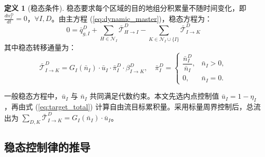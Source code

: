 \documentclass[a4paper,12pt]{article}
\theoremstyle{plain}
\theoremstyle{definition}
\newtheorem{definition}[theorem]{定义}
\theoremstyle{remark}
\begin{document}
\begin{definition}[稳态条件]\label{def:steady_state}
稳态要求每个区域的目的地组分积累量不随时间变化，即 $\frac{dn_I^D}{dt} = 0$，$\forall I, D$。由主方程 (\ref{eq:dynamic_master})，稳态方程为：
\begin{equation}\label{eq:steady_state_eq}
    0 = \bar{q}_{g,I}^D + \sum_{H \in \mathcal{N}_I} \bar{\mathcal{T}}_{H \to I}^D - \sum_{K \in \mathcal{N}_I \cup \{I\}} \bar{\mathcal{T}}_{I \to K}^D
\end{equation}
其中稳态转移通量为：
\begin{equation}\label{eq:steady_transfer}
    \bar{\mathcal{T}}_{I \to K}^D = G_I(\bar{n}_I) \cdot \bar{u}_I \cdot \bar\pi_I^D \cdot \beta_{I \to K}^D,
    \quad
    \bar\pi_I^D=
    \begin{cases}
    \dfrac{\bar n_I^D}{\bar n_I}, & \bar n_I>0,\\[0.8em]
    0, & \bar n_I=0 .
    \end{cases}
\end{equation}
\end{definition}

一般稳态方程中，$\bar u_I$ 与 $\bar n_I$ 共同满足代数约束。本文先选内点控制值 $\bar u_I=1-\eta_I$，再由式 (\ref{eq:target_total}) 计算自由流目标累积量。采用标量周界控制后，总流出为 $\sum_{D,K} \bar{\mathcal{T}}_{I \to K}^D = G_I(\bar{n}_I) \cdot \bar{u}_I$。

\subsection{稳态控制律的推导}
\end{document}
